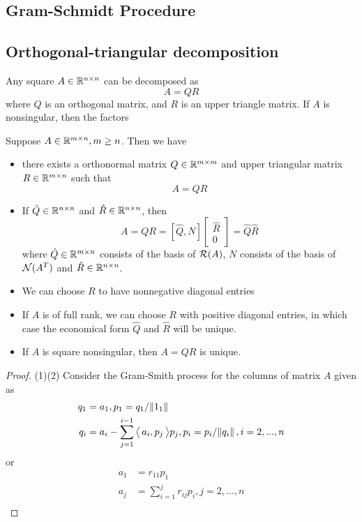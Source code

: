 \begin{refsection}
\subsection{Gram-Schmidt Procedure}

\subsection{Orthogonal-triangular decomposition}
\cite{calafiore2014optimization} Any square $A \in \mathbb{R}^{n\times n}$ can be decomposed as
$$A = QR$$
where $Q$ is an orthogonal matrix, and $R$ is an upper triangle matrix. If $A$ is nonsingular, then the factors 

\begin{theorem}[QR decomposition]
	Suppose $A\in \mathbb{R}^{m\times n},m\geq n$. Then we have
	\begin{itemize}
		\item there exists a orthonormal matrix $Q\in \mathbb{R}^{m\times m}$ and upper triangular matrix $R\in \mathbb{R}^{m\times n}$ such that $$A = QR$$
		\item If $\hat{Q}\in \mathbb{R}^{n\times n}$ and $\hat{R}\in \mathbb{R}^{n\times n}$, then
		$$A = QR=[\hat{Q},N]\begin{bmatrix}
		\hat{R}\\
		0
		\end{bmatrix} = \hat{Q}\hat{R}$$
		where $\hat{Q}\in \mathbb{R}^{m\times n}$ consists of the basis of $\mathcal{R}(A)$, $N$ consists of the basis of $\mathcal{N}(A^T)$ and $\hat{R}\in \mathbb{R}^{n\times n}$.  
		\item We can choose $R$ to have nonnegative diagonal entries
		\item If $A$ is of full rank, we can choose $R$ with positive diagonal entries, in which case the economical form $\hat{Q}$ and $\hat{R}$ will be unique. 
		\item If $A$ is square nonsingular, then $A = QR$ is unique.
	\end{itemize}
\end{theorem}
\begin{proof}
	(1)(2) Consider the Gram-Smith process for the columns of matrix $A$ given as
	\begin{align*}
	q_1 &= a_1, p_1=q_1/\norm{1_1}\\
	q_i & =a_i - \sum_{j=1}^{i-1} {\left< \, a_i,p_j \, \right>}p_j,p_i = p_i/\norm{q_i},i=2,...,n
	\end{align*}
	or
	\begin{align*}
	a_1 &= r_{11}p_1\\
	a_j &= \sum_{i=1}^j r_{ij}p_i,j=2,...,n\\

\end{align*}
\end{proof}
\end{refsection}
